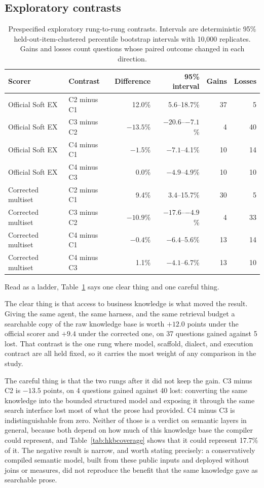 \subsection{Exploratory contrasts}

\begin{table}[htbp]
\centering
\caption{Prespecified exploratory rung-to-rung contrasts. Intervals are
deterministic 95\% held-out-item-clustered percentile bootstrap intervals with
10,000 replicates. Gains and losses count questions whose paired outcome changed
in each direction.}
\label{tab:contrasts}
\begin{tabular}{llrrrr}
\toprule
Scorer & Contrast & Difference & 95\% interval & Gains & Losses \\
\midrule
Official Soft EX & C2 minus C1 & 12.0\% & 5.6--18.7\% & 37 & 5 \\
Official Soft EX & C3 minus C2 & $-13.5$\% & $-20.6$--$-7.1$\% & 4 & 40 \\
Official Soft EX & C4 minus C1 & $-1.5$\% & $-7.1$--4.1\% & 10 & 14 \\
Official Soft EX & C4 minus C3 & 0.0\% & $-4.9$--4.9\% & 10 & 10 \\
\midrule
Corrected multiset & C2 minus C1 & 9.4\% & 3.4--15.7\% & 30 & 5 \\
Corrected multiset & C3 minus C2 & $-10.9$\% & $-17.6$--$-4.9$\% & 4 & 33 \\
Corrected multiset & C4 minus C1 & $-0.4$\% & $-6.4$--5.6\% & 13 & 14 \\
Corrected multiset & C4 minus C3 & 1.1\% & $-4.1$--6.7\% & 13 & 10 \\
\bottomrule
\end{tabular}
\end{table}

Read as a ladder, Table~\ref{tab:contrasts} says one clear thing and one careful
thing.

The clear thing is that access to business knowledge is what moved the result.
Giving the same agent, the same harness, and the same retrieval budget a
searchable copy of the raw knowledge base is worth $+12.0$ points under the
official scorer and $+9.4$ under the corrected one, on 37 questions gained
against 5 lost. That contrast is the one rung where model, scaffold, dialect, and
execution contract are all held fixed, so it carries the most weight of any
comparison in the study.

The careful thing is that the two rungs after it did not keep the gain. C3 minus
C2 is $-13.5$ points, on 4 questions gained against 40 lost: converting the same
knowledge into the bounded structured model and exposing it through the same
search interface lost most of what the prose had provided. C4 minus C3 is
indistinguishable from zero. Neither of those is a verdict on semantic layers in
general, because both depend on how much of this knowledge base the compiler
could represent, and Table~\ref{tab:hkbcoverage} shows that it could represent 17.7\% of
it. The negative result is narrow, and worth stating
precisely: a conservatively compiled semantic model, built from these public
inputs and deployed without joins or measures, did not reproduce the benefit that
the same knowledge gave as searchable prose.

